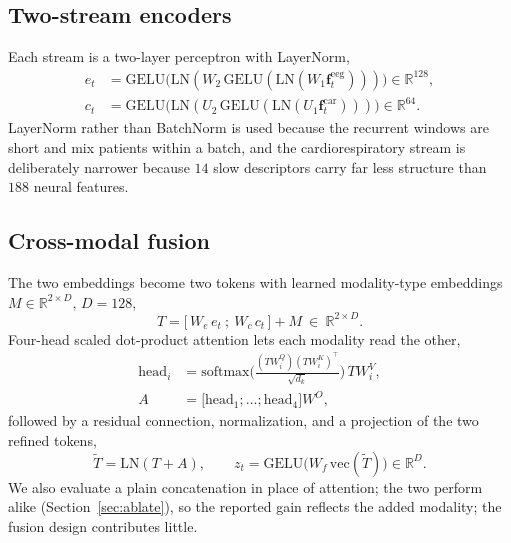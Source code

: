 \documentclass[preprint,12pt]{elsarticle}
\begin{document}
\subsection{Two-stream encoders}
Each stream is a two-layer perceptron with LayerNorm,
\begin{align}
e_t&=\mathrm{GELU}\!\big(\mathrm{LN}(W_2\,\mathrm{GELU}(\mathrm{LN}(W_1\mathbf{f}^{\mathrm{eeg}}_t))) \big)\in\mathbb{R}^{128},\\
c_t&=\mathrm{GELU}\!\big(\mathrm{LN}(U_2\,\mathrm{GELU}(\mathrm{LN}(U_1\mathbf{f}^{\mathrm{car}}_t))) \big)\in\mathbb{R}^{64}.
\end{align}
LayerNorm rather than BatchNorm is used because the recurrent windows are short and mix
patients within a batch, and the cardiorespiratory stream is deliberately narrower because
$14$ slow descriptors carry far less structure than $188$ neural features.

\subsection{Cross-modal fusion}
The two embeddings become two tokens with learned modality-type embeddings
$M\in\mathbb{R}^{2\times D}$, $D=128$,
\begin{equation}
T=\big[\,W_e\,e_t\ ;\ W_c\,c_t\,\big]+M\ \in\ \mathbb{R}^{2\times D}.
\end{equation}
Four-head scaled dot-product attention lets each modality read the other,
\begin{equation}
\begin{aligned}
\mathrm{head}_i&=\mathrm{softmax}\!\Big(\tfrac{(TW^Q_i)(TW^K_i)^{\!\top}}{\sqrt{d_k}}\Big)\,TW^V_i, \\
A&=\big[\mathrm{head}_1;\dots;\mathrm{head}_4\big]W^O,
\end{aligned}
\end{equation}
followed by a residual connection, normalization, and a projection of the two refined tokens,
\begin{equation}
\tilde T=\mathrm{LN}(T+A),\qquad z_t=\mathrm{GELU}\!\big(W_f\,\mathrm{vec}(\tilde T)\big)\in\mathbb{R}^{D}.
\end{equation}
We also evaluate a plain concatenation in place of attention; the two perform alike
(Section~\ref{sec:ablate}), so the reported gain reflects the added modality; the fusion design
contributes little.
\end{document}
